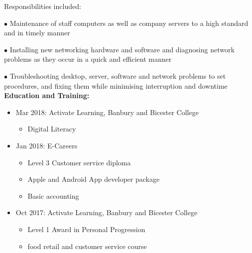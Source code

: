 \documentclass[10pt,a4paper]{book}
\begin{document}
\begin{flushleft}
Responsibilities included:

  \item[$\bullet$]Maintenance of staff computers as well as company servers to a high standard and in timely manner

  \item[$\bullet$]Installing new networking hardware and software and diagnosing network problems as they occur in a quick and efficient manner

  \item[$\bullet$]Troubleshooting desktop, server, software and network problems to set procedures, and fixing them while minimising interruption and downtime
    \linebreak{}
\linebreak{}
\textbf {Education and Training:}
\begin{itemize}
  \item Mar 2018: Activate Learning, Banbury and Bicester College
    \begin{itemize}
    \item Digital Literacy
  \end{itemize}
\end{itemize}
\begin{itemize}
  \item Jan 2018: E-Careers
    \begin{itemize}
    \item Level 3 Customer service diploma

    \item Apple and Android App developer package

    \item Basic accounting
    \end{itemize}
    \end{itemize}
    \begin{itemize}
      \item Oct 2017: Activate Learning, Banbury and Bicester College
      \begin{itemize}
    \item Level 1 Award in Personal Progression

    \item food retail and customer service course


\end{itemize}
\end{itemize}
\end{flushleft}
\end{document}
